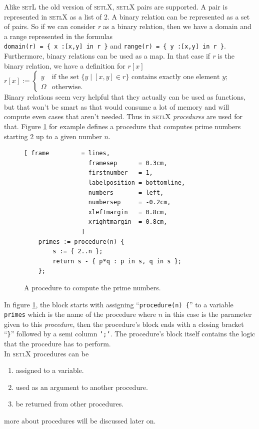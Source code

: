 \documentclass[11pt]{article}
\begin{document}
Alike \textsc{setL} the old version of \textsc{setlX}, \textsc{setlX} pairs are supported. A pair is represented in \textsc{setlX} as a list of 2. A binary relation can be represented as a set of pairs. So if we can consider \textsl{r} as a binary relation, then we have a domain and a range represented in the formulas 
\\[0.2cm]
\hspace*{1.3cm}
\texttt{domain(r) = \{ x :[x,y] in r \}} \quad and \quad
\texttt{range(r)  = \{ y :[x,y] in r \}}.
\\[0.2cm]
Furthermore, binary relations can be used as a map. In that case if \textsl{r} is the binary relation, we have a definition for $r[x]$
\\[0.2cm]
\hspace*{1.3cm}
$r[x] := \left\{
\begin{array}{ll}
  y & \mbox{if the set $\{ y \mid [x,y] \in r\}$ contains exactly one element $y$;} \\[0.2cm]
  \Omega & \mbox{otherwise}.
\end{array} \right.
$
\\[0.2cm]
Binary relations seem very helpful that they actually can be used as functions, but that won't be smart as that would consume a lot of memory and will compute even cases that aren't needed. Thus in \textsc{setlX} \textsl{procedures} are used for that. Figure \ref{fig:primes.stlx} for example defines a procedure that computes prime numbers starting $2$ up to a given number $n$.
\begin{figure}[!ht]
\centering
\begin{Verbatim}[ frame         = lines, 
                  framesep      = 0.3cm, 
                  firstnumber   = 1,
                  labelposition = bottomline,
                  numbers       = left,
                  numbersep     = -0.2cm,
                  xleftmargin   = 0.8cm,
                  xrightmargin  = 0.8cm,
                ]
    primes := procedure(n) { 
        s := { 2..n }; 
        return s - { p*q : p in s, q in s }; 
    };
\end{Verbatim}
\vspace*{-0.3cm}
\caption{A procedure to compute the prime numbers.}
\label{fig:primes.stlx}
\end{figure}

In figure \ref{fig:primes.stlx}, the block starts with assigning ``\texttt{procedure(n) \{}'' to a variable \texttt{primes} which is the name of the procedure where $n$ in this case is the parameter given to this \textsl{procedure}, then the procedure's block ends with a closing bracket ``\texttt{\}}'' followed by a semi column \texttt{';'}. The procedure's block itself contains the logic that the procedure has to perform.\\
In \textsc{setlX} procedures can be
\begin{enumerate}
\item assigned to a variable.
\item used as an argument to another procedure.
\item be returned from other procedures.
\end{enumerate}
more about procedures will be discussed later on.
\\
\end{document}

